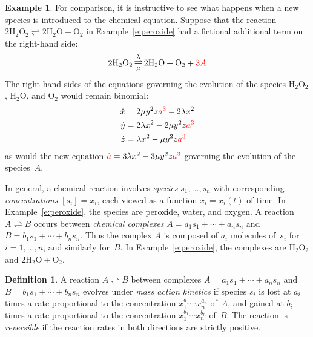 \documentclass[12pt]{amsart}
\numberwithin{equation}{section}
\theoremstyle{definition}
\newtheorem{defn}[thm]{Definition}
\newtheorem{example}[thm]{Example}
\begin{document}
\begin{example}
For comparison, it is instructive to see what happens when a new
species is introduced to the chemical equation.  Suppose that the
reaction $2{\ensuremath{\text{H}_{\text{2}}\text{O}_{\text{2}}}} \rightleftharpoons 2{\ensuremath{\text{H}_{\text{2}}\text{O}}} + {\text{O}_{\text{2}}}$ in
Example~\ref{e:peroxide} had a fictional additional term on the
right-hand side:
$$  2{\ensuremath{\text{H}_{\text{2}}\text{O}_{\text{2}}}}
  {	\mathbin{\begin{array}{@{\,}c@{\,}}
		\\[-3.5ex]\scriptstyle\lambda
		\\[-1.2ex]\rightleftharpoons
		\\[-1.5ex]\scriptstyle\mu
	\end{array}}}
  2{\ensuremath{\text{H}_{\text{2}}\text{O}}} + {\text{O}_{\text{2}}} + {\color{red}3A}
$$
The right-hand sides of the equations governing the evolution of the
species ${\ensuremath{\text{H}_{\text{2}}\text{O}_{\text{2}}}}$, ${\ensuremath{\text{H}_{\text{2}}\text{O}}}$, and ${\text{O}_{\text{2}}}$ would remain binomial:
\begin{align*}
  \dot x &= 2\mu y^2 z {\color{red}a^3} - 2\lambda x^2
\\
  \dot y &= 2\lambda x^2 - 2\mu y^2 z {\color{red}a^3}
\\
  \dot z &= \lambda x^2 - \mu y^2 z {\color{red}a^3}
\end{align*}
as would the new equation ${\color{red}\dot a} = 3\lambda x^2 - 3\mu
y^2 z {\color{red}a^3}$ governing the evolution of the species~$A$.
\end{example}

In general, a chemical reaction involves \emph{species}
$s_1,\ldots,s_n$ with corresponding \emph{concentrations} $[s_i] =
x_i$, each viewed as a function $x_i = x_i(t)$ of time.  In
Example~\ref{e:peroxide}, the species are peroxide, water, and oxygen.
A reaction $A \rightleftharpoons B$ occurs between \emph{chemical
complexes} $A = a_1 s_1 + \cdots + a_n s_n$ and $B = b_1 s_1 + \cdots
+ b_n s_n$.  Thus the complex $A$ is composed of $a_i$ molecules
of~$s_i$ for $i = 1,\ldots,n$, and similarly for~$B$.  In
Example~\ref{e:peroxide}, the complexes are ${\ensuremath{\text{H}_{\text{2}}\text{O}_{\text{2}}}}$ and $2{\ensuremath{\text{H}_{\text{2}}\text{O}}} +
{\text{O}_{\text{2}}}$.

\begin{defn}\label{d:mass-action}
A reaction $A \rightleftharpoons B$ between complexes $A = a_1 s_1 +
\cdots + a_n s_n$ and $B = b_1 s_1 + \cdots + b_n s_n$ evolves under
\emph{mass action kinetics} \cite{GW1864} if species $s_i$ is lost at
$a_i$ times a rate proportional to the concentration $x_1^{a_1} \cdots
x_n^{a_n}$ of~$A$, and gained at $b_i$ times a rate proportional to
the concentration $x_1^{b_1} \cdots x_n^{b_n}$ of~$B$.  The reaction
is \emph{reversible} if the reaction rates in both directions are
strictly positive.
\end{defn}
\end{document}
